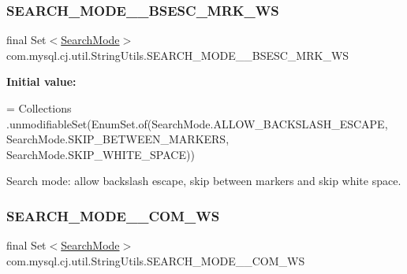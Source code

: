 \subsubsection{\texorpdfstring{S\+E\+A\+R\+C\+H\+\_\+\+M\+O\+D\+E\+\_\+\+\_\+\+B\+S\+E\+S\+C\+\_\+\+M\+R\+K\+\_\+\+WS}{SEARCH\_MODE\_\_BSESC\_MRK\_WS}}
{\footnotesize\ttfamily final Set$<$\mbox{\hyperlink{enumcom_1_1mysql_1_1cj_1_1util_1_1_string_utils_1_1_search_mode}{Search\+Mode}}$>$ com.\+mysql.\+cj.\+util.\+String\+Utils.\+S\+E\+A\+R\+C\+H\+\_\+\+M\+O\+D\+E\+\_\+\+\_\+\+B\+S\+E\+S\+C\+\_\+\+M\+R\+K\+\_\+\+WS\hspace{0.3cm}{\ttfamily [static]}}

{\bfseries Initial value\+:}
\begin{DoxyCode}
= Collections
            .unmodifiableSet(EnumSet.of(SearchMode.ALLOW\_BACKSLASH\_ESCAPE, SearchMode.SKIP\_BETWEEN\_MARKERS,
       SearchMode.SKIP\_WHITE\_SPACE))
\end{DoxyCode}
Search mode\+: allow backslash escape, skip between markers and skip white space. \mbox{\label{classcom_1_1mysql_1_1cj_1_1util_1_1_string_utils_a38602d2b01fcc1aee1f16f5fc488d946}} 
\subsubsection{\texorpdfstring{S\+E\+A\+R\+C\+H\+\_\+\+M\+O\+D\+E\+\_\+\+\_\+\+C\+O\+M\+\_\+\+WS}{SEARCH\_MODE\_\_COM\_WS}}
{\footnotesize\ttfamily final Set$<$\mbox{\hyperlink{enumcom_1_1mysql_1_1cj_1_1util_1_1_string_utils_1_1_search_mode}{Search\+Mode}}$>$ com.\+mysql.\+cj.\+util.\+String\+Utils.\+S\+E\+A\+R\+C\+H\+\_\+\+M\+O\+D\+E\+\_\+\+\_\+\+C\+O\+M\+\_\+\+WS\hspace{0.3cm}{\ttfamily [static]}}

